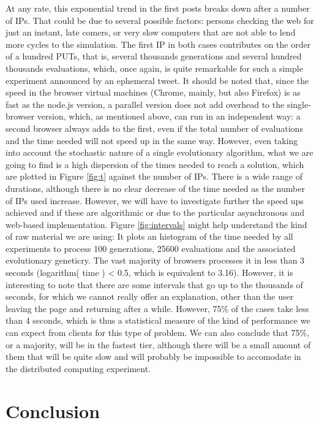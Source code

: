 \documentclass{sig-alternate}
\begin{document}
At any rate, this exponential trend in the first posts breaks down
after a number of IPs. That could be due to several possible factors:
persons checking the web for just an instant, late comers, or very
slow computers that are not able to lend more cycles to the
simulation. The first IP in both cases contributes on the order of a
hundred PUTs, that is, several thousands generations and several
hundred thousands evaluations, which, once again, is quite remarkable
for such a simple experiment announced by an ephemeral tweet. It
should be noted that, since the speed in the browser virtual machines
(Chrome, mainly, but also Firefox) is as fast as the node.js version,
a parallel version does not add overhead to the single-browser
version, which, as mentioned above, can run in an independent
way: a second browser always adds to the first, even if the total
number of evaluations and the time needed will not speed up in the
same way. However, even taking into account the stochastic nature of a
single evolutionary algorithm, what we are going to find is a high
dispersion of the times needed to reach a solution, which are plotted
in Figure \ref{fig:t} against the number of IPs. There is a wide
range of durations, although there is no clear decrease of the time
needed as the number of IPs used increase. However, we will have to
investigate further the speed ups achieved and if these are
algorithmic or due to the particular asynchronous and web-based
implementation. Figure \ref{fig:intervals} might help understand the
kind of raw material we are using: It plots an histogram of the time
needed by all experiments to process 100 generations, 25600
evaluations and the associated evolutionary geneticry. The vast
majority of browsers processes it in less than 3 seconds (logarithm(
time ) < 0.5, which is equivalent to 3.16). However, it is interesting
to note that there are some intervals that go up to the thousands of
seconds, for which we cannot really offer an explanation, other than
the user leaving the page and returning after a while. However, 75\%
of the cases take less than 4 seconds, which is thus a statistical
measure of the kind of performance we can expect from clients for this
type of problem. We can also conclude that 75\%, or a majority, will
be in the fastest tier, although there will be a small amount of them
that will be quite slow and will probably be impossible to accomodate
in the distributed computing experiment.

\section{Conclusion}
\label{sec:conc}
\end{document}

